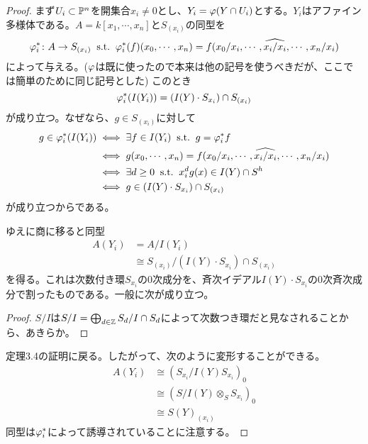 \begin{proof}
  まず$U_i \subset \P^n$を開集合$x_i \neq 0$とし、$Y_i = \vp(Y \cap U_i)$とする。$Y_i$はアファイン多様体である。$A = k[x_1, \cdots , x_n]$と$S_{(x_i)}$の同型を
\[
\vp^*_i \colon A \to S_{(x_i)} \st \vp^*_i(f)(x_0, \cdots , x_n) = f(x_0/x_i, \cdots , \widehat{x_i/x_i} , \cdots , x_n/x_i)
\]
によって与える。($\vp$は既に使ったので本来は他の記号を使うべきだが、ここでは簡単のために同じ記号とした) このとき
\[
\vp_i^*(I(Y_i)) = (I(Y)\cdot S_{x_i} ) \cap S_{(x_i)}
\]
が成り立つ。なぜなら、$g \in S_{(x_i)}$に対して
\begin{align*}
  g \in \vp_i^*(I(Y_i)) &\iff \exists f \in I(Y_i) \st g = \vp^*_i f \\
  &\iff g(x_0, \cdots , x_n) =  f(x_0/x_i, \cdots , \widehat{x_i/x_i} , \cdots , x_n/x_i) \\
  &\iff \exists d \geq 0 \st x_i^d g(x) \in I(Y) \cap S^h \\
  &\iff g \in (I(Y)\cdot S_{x_i} ) \cap S_{(x_i)}
\end{align*}
が成り立つからである。

ゆえに商に移ると同型
\begin{align*}
  A(Y_i) &= A/I(Y_i) \\
  &\cong S_{(x_i)} / (I(Y)\cdot S_{x_i} ) \cap S_{(x_i)}
\end{align*}
を得る。これは次数付き環$S_{x_i}$の0次成分を、斉次イデアル$I(Y) \cdot S_{x_i}$の0次斉次成分で割ったものである。一般に次が成り立つ。
\begin{proof}
  $S/I$は$S/I = \bigoplus_{d \in \Z} S_d/I \cap S_d$によって次数つき環だと見なされることから、あきらか。
\end{proof}
定理3.4の証明に戻る。したがって、次のように変形することができる。
\begin{align*}
  A(Y_i) &\cong (S_{x_i}/ I(Y)S_{x_i})_0 \\
  &\cong (S/I(Y) \otimes_S S_{x_i})_0 \\
  &\cong S(Y)_{(x_i)}
\end{align*}
同型は$\vp^*_i$によって誘導されていることに注意する。


\end{proof}
